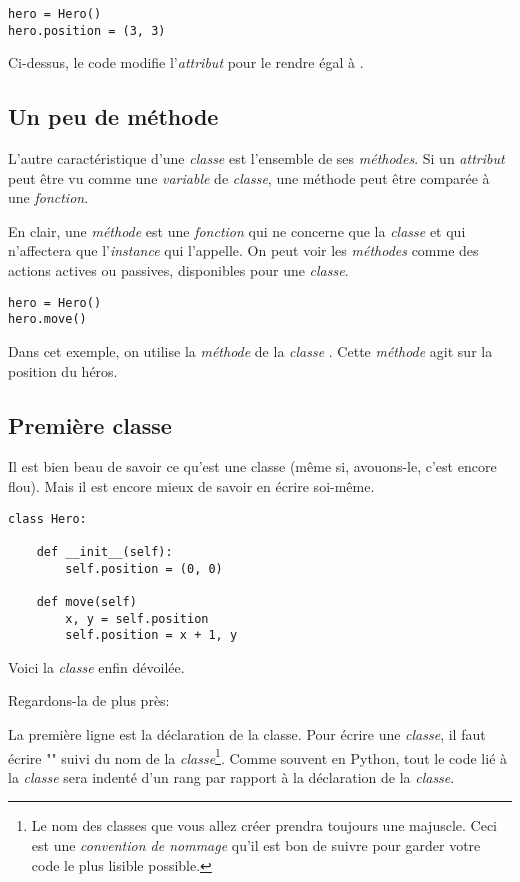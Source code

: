 \begin{lstlisting}
hero = Hero()
hero.position = (3, 3)
\end{lstlisting}

Ci-dessus, le code modifie l'\emph{attribut}  pour le rendre égal à .

\subsection{Un peu de méthode}

L'autre caractéristique d'une \emph{classe} est l'ensemble de ses \emph{méthodes}.
Si un \emph{attribut} peut être vu comme une \emph{variable} de \emph{classe}, une méthode peut être comparée à une \emph{fonction}.

En clair, une \emph{méthode} est une \emph{fonction} qui ne concerne que la \emph{classe} et qui n'affectera que l'\emph{instance} qui l'appelle.
On peut voir les \emph{méthodes} comme des actions actives ou passives, disponibles pour une \emph{classe}.

\begin{lstlisting}
hero = Hero()
hero.move()
\end{lstlisting}

Dans cet exemple, on utilise la \emph{méthode}  de la \emph{classe} .
Cette \emph{méthode} agit sur la position du héros.

\pagebreak
\subsection{Première classe}

Il est bien beau de savoir ce qu'est une classe (même si, avouons-le, c'est encore flou). Mais il est encore mieux de savoir en écrire soi-même.

\begin{lstlisting}
class Hero:

	def __init__(self):
		self.position = (0, 0)
		
	def move(self)
		x, y = self.position
		self.position = x + 1, y
\end{lstlisting}

Voici la \emph{classe}  enfin dévoilée.

Regardons-la de plus près:

La première ligne est la déclaration de la classe.
Pour écrire une \emph{classe}, il faut écrire "" suivi du nom de la \emph{classe}\footnote{Le nom des classes que vous allez créer prendra toujours une majuscle. Ceci est une \emph{convention de nommage} qu'il est bon de suivre pour garder votre code le plus lisible possible.}.
Comme souvent en Python, tout le code lié à la \emph{classe} sera indenté d'un rang par rapport à la déclaration de la \emph{classe}.

